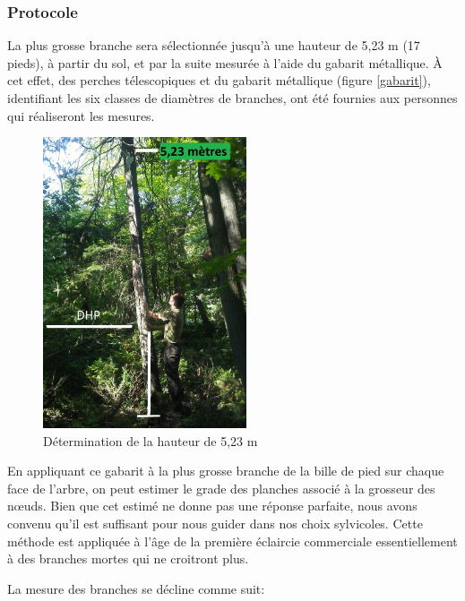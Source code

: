 \documentclass[letterpaper, 12pt]{article}
\begin{document}
\begin{onehalfspace}
\subsubsection{Protocole}

La plus grosse branche sera sélectionnée jusqu’à une hauteur de 5,23 m (17 pieds), à partir du sol, et par la suite mesurée à l’aide du gabarit métallique. À cet effet, des perches télescopiques et du gabarit métallique (figure \ref{gabarit}), identifiant les six classes de diamètres de branches, ont été fournies aux personnes qui réaliseront les mesures.

\vspace{12pt}

\begin{figure}[H]
	\centering
	\includegraphics[width=6cm]{Figure5}
	\caption{Détermination de la hauteur de 5,23 m}
	\label{determination}
\end{figure}

\vspace{12pt}

En appliquant ce gabarit à la plus grosse branche de la bille de pied sur chaque face de l’arbre, on peut estimer le grade des planches associé à la grosseur des nœuds. Bien que cet estimé ne donne pas une réponse parfaite, nous avons convenu qu’il est suffisant pour nous guider dans nos choix sylvicoles. Cette méthode est appliquée à l’âge de la première éclaircie commerciale essentiellement à des branches mortes qui ne croitront plus.

\vspace{12pt}

La mesure des branches se décline comme suit:

\begin{enumerate}
	

\end{enumerate}
\end{onehalfspace}
\end{document}
